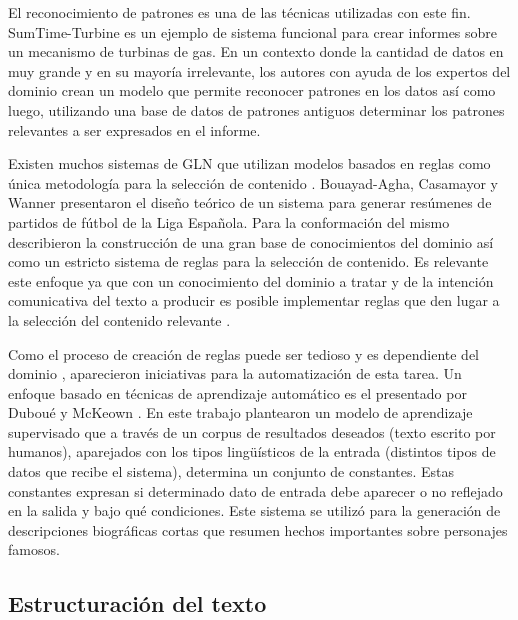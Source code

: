     El reconocimiento de patrones es una de las t\'ecnicas utilizadas con este fin.  SumTime-Turbine es un ejemplo de sistema funcional para crear
 informes sobre un mecanismo de turbinas de gas. En un contexto donde la cantidad de datos en muy grande y en su mayoría irrelevante, 
 los autores con ayuda de los expertos del dominio crean un modelo que permite reconocer patrones en los datos así como luego, utilizando una base de datos de patrones 
antiguos determinar los patrones relevantes a ser expresados en el informe. 

    Existen muchos sistemas de GLN que utilizan modelos basados en reglas como \'unica metodolog\'ia para la selecci\'on de contenido . Bouayad-Agha, Casamayor y 
Wanner  presentaron el dise\~no te\'orico de un sistema para generar resúmenes de partidos de 
fútbol de la Liga Espa\~nola. Para la conformaci\'on del mismo describieron la construcci\'on de una gran base de conocimientos del dominio as\'i como 
un estricto sistema de reglas para la selecci\'on de contenido. Es relevante este enfoque ya que con un conocimiento del dominio a tratar y de la intenci\'on comunicativa del texto a producir 
es posible implementar reglas que den lugar a la selección del contenido relevante . 

    Como el proceso de creaci\'on de reglas puede ser tedioso y es dependiente del dominio , aparecieron iniciativas para la automatizaci\'on de esta tarea. Un enfoque 
basado en t\'ecnicas de aprendizaje autom\'atico es el presentado por Dubou\'e y McKeown . En este trabajo plantearon un modelo de aprendizaje supervisado que a trav\'es de
un corpus de resultados deseados (texto escrito por humanos), aparejados con los tipos lingüísticos de la entrada (distintos tipos de datos que recibe el sistema), determina un conjunto de constantes. Estas constantes 
expresan si determinado dato de entrada debe aparecer o no reflejado en la salida y bajo qué condiciones. Este sistema se utilizó para la generación de descripciones biográficas cortas que resumen hechos 
importantes sobre personajes famosos.

\subsection{Estructuración del texto}\label{subsection:estructuracion}

